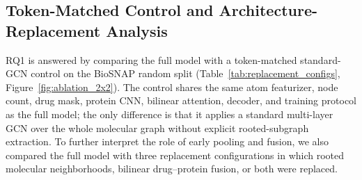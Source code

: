 \documentclass[computers,article,submit,moreauthors]{Definitions/mdpi}
\begin{document}
\subsection{Token-Matched Control and Architecture-Replacement Analysis}
RQ1 is answered by comparing the full model with a token-matched standard-GCN control on the BioSNAP random split (Table~\ref{tab:replacement_configs}, Figure~\ref{fig:ablation_2x2}). The control shares the same atom featurizer, node count, drug mask, protein CNN, bilinear attention, decoder, and training protocol as the full model; the only difference is that it applies a standard multi-layer GCN over the whole molecular graph without explicit rooted-subgraph extraction. To further interpret the role of early pooling and fusion, we also compared the full model with three replacement configurations in which rooted molecular neighborhoods, bilinear drug--protein fusion, or both were replaced.
\end{document}
